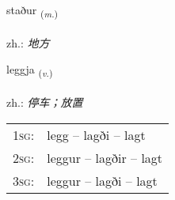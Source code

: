 \documentclass[frontgrid, backgrid]{flacards}\usepackage[]{graphicx}\usepackage[]{xcolor}
\begin{document}
{staður \small{\textsubscript{(\textit{m.})}} \\[1ex] %
\textphonetic{[staːðʏr]} \\
zh.: \emph{地方} \\  [2ex]
\renewcommand*{\arraystretch}{0.8}
}

\renewcommand{\flhead}{\vskip5pt \fboxsep=0pt {\small\bfseries\footnotesize Sagnorð | 动词}}
\renewcommand{\fcfoot}{\vskip5pt \fboxsep=0pt \hspace{2pt}{\small\bfseries\footnotesize 1K}}

\renewcommand{\blhead}{\vskip5pt {\small\bfseries\footnotesize Sagnorð | 动词 }}
\renewcommand{\bcfoot}{\vskip5pt \hspace{2pt}{\small\bfseries\footnotesize 1K}}


{leggja \small{\textsubscript{(\textit{v.})}} \\[1ex] %
\textphonetic{[lɛca]} \\
zh.: \emph{停车；放置} \\  [2ex]
\renewcommand*{\arraystretch}{0.8}
\begin{tabular}{p{1cm}l}
\textsc{1sg}: & legg -- lagði -- lagt \\ 
\textsc{2sg}: & leggur -- lagðir -- lagt \\ 
\textsc{3sg}: & leggur -- lagði -- lagt \\ 
\end{tabular}
}

\renewcommand{\flhead}{\vskip5pt \fboxsep=0pt {\small\bfseries\footnotesize Fornafn | 代词}}
\renewcommand{\fcfoot}{\vskip5pt \fboxsep=0pt \hspace{2pt}{\small\bfseries\footnotesize 1K}}
\end{document}
